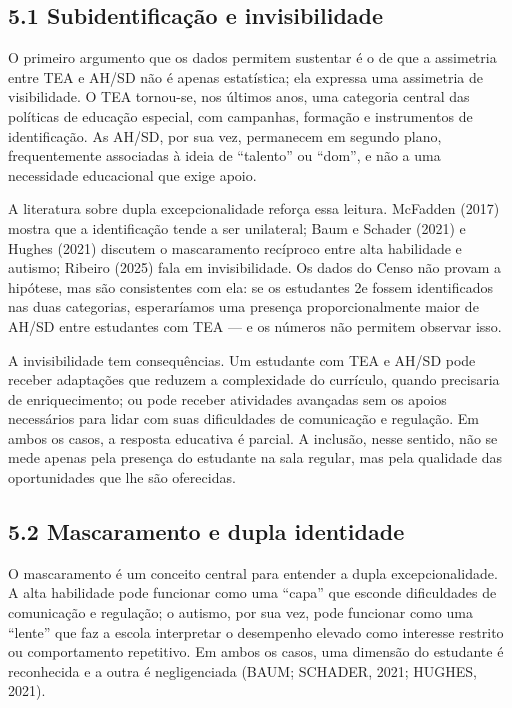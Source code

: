 \subsection{5.1 Subidentificação e
invisibilidade}\label{subidentificauxe7uxe3o-e-invisibilidade}

O primeiro argumento que os dados permitem sustentar é o de que a
assimetria entre TEA e AH/SD não é apenas estatística; ela expressa uma
assimetria de visibilidade. O TEA tornou-se, nos últimos anos, uma
categoria central das políticas de educação especial, com campanhas,
formação e instrumentos de identificação. As AH/SD, por sua vez,
permanecem em segundo plano, frequentemente associadas à ideia de
``talento'' ou ``dom'', e não a uma necessidade educacional que exige
apoio.

A literatura sobre dupla excepcionalidade reforça essa leitura. McFadden
(2017) mostra que a identificação tende a ser unilateral; Baum e Schader
(2021) e Hughes (2021) discutem o mascaramento recíproco entre alta
habilidade e autismo; Ribeiro (2025) fala em invisibilidade. Os dados do
Censo não provam a hipótese, mas são consistentes com ela: se os
estudantes 2e fossem identificados nas duas categorias, esperaríamos uma
presença proporcionalmente maior de AH/SD entre estudantes com TEA --- e
os números não permitem observar isso.

A invisibilidade tem consequências. Um estudante com TEA e AH/SD pode
receber adaptações que reduzem a complexidade do currículo, quando
precisaria de enriquecimento; ou pode receber atividades avançadas sem
os apoios necessários para lidar com suas dificuldades de comunicação e
regulação. Em ambos os casos, a resposta educativa é parcial. A
inclusão, nesse sentido, não se mede apenas pela presença do estudante
na sala regular, mas pela qualidade das oportunidades que lhe são
oferecidas.

\subsection{5.2 Mascaramento e dupla
identidade}\label{mascaramento-e-dupla-identidade}

O mascaramento é um conceito central para entender a dupla
excepcionalidade. A alta habilidade pode funcionar como uma ``capa'' que
esconde dificuldades de comunicação e regulação; o autismo, por sua vez,
pode funcionar como uma ``lente'' que faz a escola interpretar o
desempenho elevado como interesse restrito ou comportamento repetitivo.
Em ambos os casos, uma dimensão do estudante é reconhecida e a outra é
negligenciada (BAUM; SCHADER, 2021; HUGHES, 2021).

